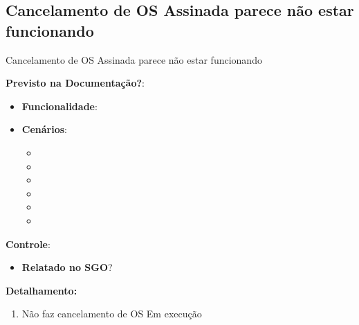 \subsection{Cancelamento de OS Assinada parece não estar funcionando}
\begin{falha}[0]{Cancelamento de OS Assinada parece não estar funcionando}
	
	
	\textbf{Previsto na Documentação?}: \mschecksim
	\begin{itemize}
		\item \textbf{Funcionalidade}: \sosFq
		\item \textbf{Cenários}: 
		\begin{itemize}
			\item \sosFqCu 
			\item \sosFqCd 
			\item \sosFqCt 
			\item \sosFqCq 
			\item \sosFqCc 
			\item \sosFqCs
		\end{itemize}
	\end{itemize}

	\textbf{Controle}:
	\begin{itemize}
		\item \textbf{Relatado no SGO}? \mschecksim 
	\end{itemize}

	
	\tcblower
	
	\textbf{Detalhamento:}
	\begin{enumerate}
		\item Não faz cancelamento de OS Em execução
	\end{enumerate}
	
\end{falha}


